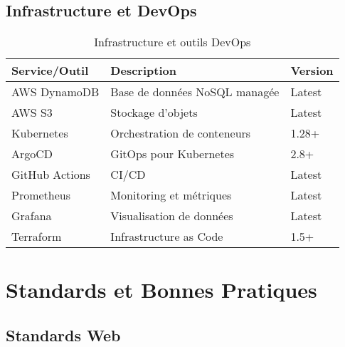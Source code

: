 \subsection{Infrastructure et DevOps}

\begin{table}[H]
    \centering
    \begin{tabularx}{\textwidth}{|l|X|l|}
        \hline
        \textbf{Service/Outil} & \textbf{Description} & \textbf{Version} \\
        \hline
        AWS DynamoDB & Base de données NoSQL managée & Latest \\
        \hline
        AWS S3 & Stockage d'objets & Latest \\
        \hline
        Kubernetes & Orchestration de conteneurs & 1.28+ \\
        \hline
        ArgoCD & GitOps pour Kubernetes & 2.8+ \\
        \hline
        GitHub Actions & CI/CD & Latest \\
        \hline
        Prometheus & Monitoring et métriques & Latest \\
        \hline
        Grafana & Visualisation de données & Latest \\
        \hline
        Terraform & Infrastructure as Code & 1.5+ \\
        \hline
    \end{tabularx}
    \caption{Infrastructure et outils DevOps}
    \label{tab:infrastructure_ref}
\end{table}

\section{Standards et Bonnes Pratiques}

\subsection{Standards Web}

